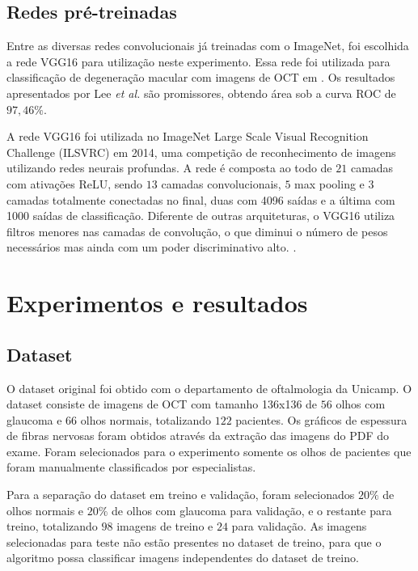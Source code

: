 \documentclass[conference]{IEEEtran}
\begin{document}
  \subsection{Redes pré-treinadas}


  Entre as diversas redes convolucionais já treinadas com o ImageNet, foi escolhida a rede VGG16 para utilização neste experimento. Essa rede foi utilizada para classificação de degeneração macular com imagens de OCT em \cite{lee2017}. Os resultados apresentados por Lee \textit{et al.} são promissores, obtendo área sob a curva ROC de $97,46\%$.

  A rede VGG16 foi utilizada no ImageNet Large Scale Visual Recognition Challenge (ILSVRC) em 2014, uma competição de reconhecimento de imagens utilizando redes neurais profundas. A rede é composta ao todo de $21$ camadas com ativações ReLU, sendo $13$ camadas convolucionais, $5$ max pooling e $3$ camadas totalmente conectadas no final, duas com 4096 saídas e a última com 1000 saídas de classificação. Diferente de outras arquiteturas, o VGG16 utiliza filtros menores nas camadas de convolução, o que diminui o número de pesos necessários mas ainda com um poder discriminativo alto. \cite{simonyan2014}.

\section{Experimentos e resultados}

  \subsection{Dataset}


  O dataset original foi obtido com o departamento de oftalmologia da Unicamp. O dataset consiste de imagens de OCT com tamanho 136x136 de $56$ olhos com glaucoma e $66$ olhos normais, totalizando $122$ pacientes. Os gráficos de espessura de fibras nervosas foram obtidos através da extração das imagens do PDF do exame. Foram selecionados para o experimento somente os olhos de pacientes que foram manualmente classificados por especialistas.

  Para a separação do dataset em treino e validação, foram selecionados $20\%$ de olhos normais e $20\%$ de olhos com glaucoma para validação, e o restante para treino, totalizando $98$ imagens de treino e $24$ para validação. As imagens selecionadas para teste não estão presentes no dataset de treino, para que o algoritmo possa classificar imagens independentes do dataset de treino.
\end{document}
